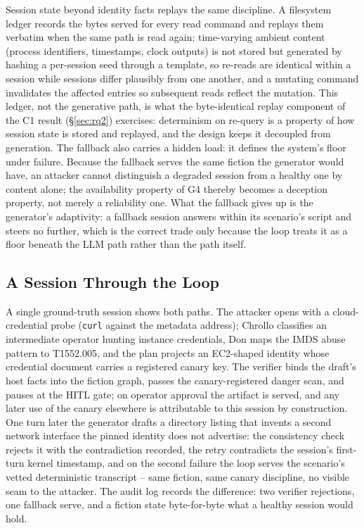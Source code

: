 Session state beyond identity facts replays the same discipline. A
filesystem ledger records the bytes served for every read command and
replays them verbatim when the same path is read again; time-varying
ambient content (process identifiers, timestamps, clock outputs) is not
stored but generated by hashing a per-session seed through a template,
so re-reads are identical within a session while sessions differ
plausibly from one another, and a mutating command invalidates the
affected entries so subsequent reads reflect the mutation. This ledger,
not the generative path, is what the byte-identical replay component of
the C1 result (\S\ref{sec:rq2}) exercises: determinism on re-query is a
property of how session state is stored and replayed, and the design
keeps it decoupled from generation.
The fallback also carries a hidden load: it defines the system's floor
under failure. Because the fallback serves the same fiction the generator
would have, an attacker cannot distinguish a degraded session from a
healthy one by content alone; the availability
property of G4 thereby becomes a deception property, not merely a reliability one.
What the fallback gives up is the generator's adaptivity: a fallback
session answers within its scenario's script and steers no further,
which is the correct trade only because the loop treats it as a floor
beneath the LLM path rather than the path itself.

\subsection{A Session Through the Loop}
\label{sec:example}
A single ground-truth session shows both paths. The attacker opens with
a cloud-credential probe (\texttt{curl} against the metadata address);
Chrollo classifies an intermediate operator hunting instance
credentials, Don maps the IMDS abuse pattern to \attck T1552.005, and
the plan projects an EC2-shaped identity whose credential document
carries a registered canary key. The verifier binds the draft's host
facts into the fiction graph, passes the canary-registered danger scan,
and pauses at the HITL gate; on operator approval the artifact is
served, and any later use of the canary elsewhere is attributable to
this session by construction. One turn later the generator drafts a
directory listing that invents a second network interface the pinned
identity does not advertise: the consistency check rejects it with the
contradiction recorded, the retry contradicts the session's first-turn
kernel timestamp, and on the second failure the loop serves the
scenario's vetted deterministic transcript -- same fiction, same canary
discipline, no visible seam to the attacker. The audit log records the
difference: two verifier rejections, one fallback serve, and a fiction
state byte-for-byte what a healthy session would hold.


